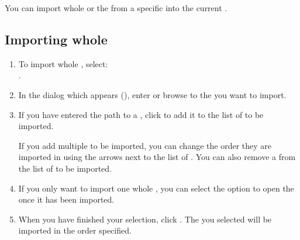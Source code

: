 
You can import whole \gdprojects{}  or the \gdcases{}  from a specific \gdproject{} into the current \gdproject{}. 

\subsection{Importing whole \gdprojects{}}
\label{ImportProject}

\begin{enumerate} 
\item To import whole \gdprojects{},  select:\\
 . 
\item In the dialog which appears (), enter or browse to the \gdprojects{} you want to import. 

\item If you have entered the path to a \gdproject{}, click  to add it to the list of \gdprojects{} to be imported. 


If you add multiple \gdprojects{} to be imported, you can change the order they are imported in using the arrows next to the list of \gdprojects{}. You can also remove a \gdproject{} from the list of \gdprojects{} to be imported. 

\item If you only want to import one whole \gdproject{}, you can select the option to open the \gdproject{} once it has been imported. 

\item When you have finished your selection, click . The \gdprojects{} you selected will be imported in the order specified. 
\end{enumerate}


